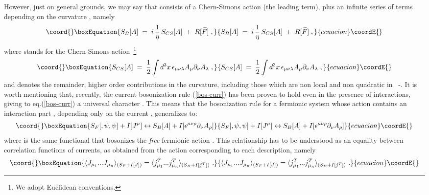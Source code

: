 \documentclass[a4paper,12pt]{article}
\begin{document}
However, just on general grounds, we may say that \coordHE{}
consists of a Chern-Simons action (the leading term), plus an infinite
series of terms depending on the curvature \coordHE{}, namely
\begin{equation}\coord{}\boxEquation{
S_B[A]\;=\; i \,\frac{1}{\eta} \,S_{CS}[A]\;+\; R [\widetilde{F}]\;,
\label{act-bos1}
}{
S_B[A]\;=\; i \,\frac{1}{\eta} \,S_{CS}[A]\;+\; R [\widetilde{F}]\;,
}{ecuacion}\coordE{}\end{equation}
where \coordHE{} stands for the Chern-Simons action~\footnote{We
  adopt Euclidean conventions.}
\begin{equation}\coord{}\boxEquation{
 \label{c-s}
S_{CS}[A]\;=\;\frac{1}{2}\int d^3x \, \epsilon_{\mu\nu\lambda}A_\mu
\partial _\nu A_\lambda \;,
}{
 S_{CS}[A]\;=\;\frac{1}{2}\int d^3x \, \epsilon_{\mu\nu\lambda}A_\mu
\partial _\nu A_\lambda \;,
}{ecuacion}\coordE{}\end{equation}
and \coordHE{} denotes the remainder, higher order
contributions in the curvature, including those which are non local and
non quadratic in \coordHE{}~\cite{result1}-\cite{result6}.  It is
worth mentioning that, recently, the current bosonization rule
(\ref{bos-curr}) has been proven to hold even in the presence of
interactions, giving to eq.(\ref{bos-curr}) a universal character
\cite{result6}. This means that the bosonization rule for a fermionic
system whose action contains an interaction part \coordHE{}, depending
only on the current \coordHE{}, generalizes to:
\begin{equation}\coord{}\boxEquation{
S_F[,{\bar\psi},\psi]+I[J^\mu] \leftrightarrow S_B[A]+I[\epsilon^{\mu
\nu \rho}\partial_\nu A_\rho]
\label{urules}
}{
S_F[,{\bar\psi},\psi]+I[J^\mu] \leftrightarrow S_B[A]+I[\epsilon^{\mu
\nu \rho}\partial_\nu A_\rho]
}{ecuacion}\coordE{}\end{equation}
where \coordHE{} is the same functional that bosonizes the {\it free}
fermionic action \coordHE{}. This relationship has to be understood as
an equality between correlation functions of currents, as obtained from
the action corresponding to each description, namely
\begin{equation}\coord{}\boxEquation{
\langle J_{\mu_1} ... J_{\mu_n} \rangle_{(S_F+I[J])} = \langle
j^T_{\mu_1} ... j^T_{\mu_n} \rangle_{(S_B+I[j^T])} \ .
\label{univ-rules}
}{
\langle J_{\mu_1} ... J_{\mu_n} \rangle_{(S_F+I[J])} = \langle
j^T_{\mu_1} ... j^T_{\mu_n} \rangle_{(S_B+I[j^T])} \ .
}{ecuacion}\coordE{}\end{equation}
\end{document}
